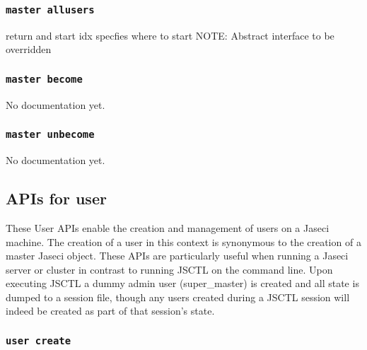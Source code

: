 \subsubsection{\lstinline[basicstyle=\Large\ttfamily]$master allusers$}

{return and start idx specfies where to start
NOTE: Abstract interface to be overridden}
\subsubsection{\lstinline[basicstyle=\Large\ttfamily]$master become$}

{No documentation yet.}
\subsubsection{\lstinline[basicstyle=\Large\ttfamily]$master unbecome$}

{No documentation yet.}
\subsection{APIs for user}

\par
These User APIs enable the creation and management of users on a Jaseci machine.
The creation of a user in this context is synonymous to the creation of a master
Jaseci object. These APIs are particularly useful when running a Jaseci server
or cluster in contrast to running JSCTL on the command line. Upon executing JSCTL
a dummy admin user (super\_master) is created and all state is dumped to a session
file, though any users created during a JSCTL session will indeed be created as
part of that session's state.

\subsubsection{\lstinline[basicstyle=\Large\ttfamily]$user create$}

